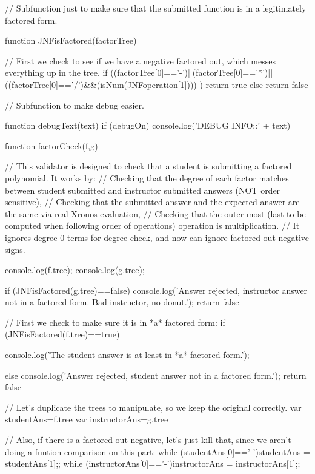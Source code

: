 \documentclass{ximera}
\begin{document}
\begin{javascript}
// Subfunction just to make sure that the submitted function is in a legitimately factored form.

function JNFisFactored(factorTree) {
   
    // First we check to see if we have a negative factored out, which messes everything up in the tree.
    if ((factorTree[0]=='-')||(factorTree[0]=='*')||((factorTree[0]=='/')&&(isNum(JNFoperation[1])))
    ) {return true} else {return false}
}

// Subfunction to make debug easier.

function debugText(text) {
    if (debugOn) {
    console.log('DEBUG INFO::' + text)
    }
}



function factorCheck(f,g) {
    // This validator is designed to check that a student is submitting a factored polynomial. It works by:
    //  Checking that the degree of each factor matches between student submitted and instructor submitted answers (NOT order sensitive),
    //  Checking that the submitted answer and the expected answer are the same via real Xronos evaluation,
    //  Checking that the outer most (last to be computed when following order of operations) operation is multiplication.
    //  It ignores degree 0 terms for degree check, and now can ignore factored out negative signs.
    
    
    console.log(f.tree);
    console.log(g.tree);

    if (JNFisFactored(g.tree)==false) {
        console.log('Answer rejected, instructor answer not in a factored form. Bad instructor, no donut.');
        return false
    }
    
    // First we check to make sure it is in *a* factored form:
    if (JNFisFactored(f.tree)==true) {
        console.log('The student answer is at least in *a* factored form.');
        
        
    } else {
        console.log('Answer rejected, student answer not in a factored form.');
        return false
    }
    
    // Let's duplicate the trees to manipulate, so we keep the original correctly.
    var studentAns=f.tree
    var instructorAns=g.tree
    
    // Also, if there is a factored out negative, let's just kill that, since we aren't doing a funtion comparison on this part:
    while (studentAns[0]=='-'){studentAns = studentAns[1];};
    while (instructorAns[0]=='-'){instructorAns = instructorAns[1];};
    
}
\end{javascript}
\end{document}
